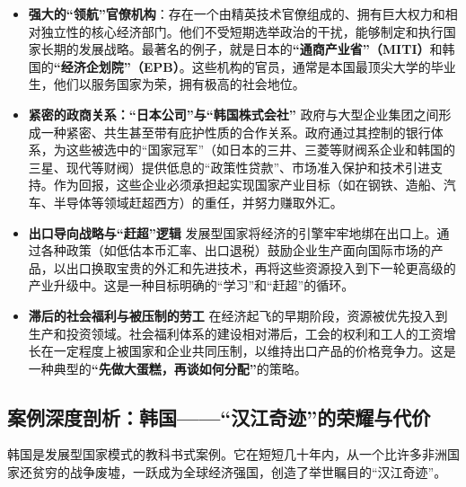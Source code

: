 \begin{itemize}
\item \textbf{强大的“领航”官僚机构}：存在一个由精英技术官僚组成的、拥有巨大权力和相对独立性的核心经济部门。他们不受短期选举政治的干扰，能够制定和执行国家长期的发展战略。最著名的例子，就是日本的\textbf{“通商产业省”（MITI）}和韩国的\textbf{“经济企划院”（EPB）}。这些机构的官员，通常是本国最顶尖大学的毕业生，他们以服务国家为荣，拥有极高的社会地位。
\item \textbf{紧密的政商关系：“日本公司”与“韩国株式会社”}
政府与大型企业集团之间形成一种紧密、共生甚至带有庇护性质的合作关系。政府通过其控制的银行体系，为这些被选中的“国家冠军”（如日本的三井、三菱等财阀系企业和韩国的三星、现代等财阀）提供低息的“政策性贷款”、市场准入保护和技术引进支持。作为回报，这些企业必须承担起实现国家产业目标（如在钢铁、造船、汽车、半导体等领域赶超西方）的重任，并努力赚取外汇。
\item \textbf{出口导向战略与“赶超”逻辑}
发展型国家将经济的引擎牢牢地绑在出口上。通过各种政策（如低估本币汇率、出口退税）鼓励企业生产面向国际市场的产品，以出口换取宝贵的外汇和先进技术，再将这些资源投入到下一轮更高级的产业升级中。这是一种目标明确的“学习”和“赶超”的循环。
\item \textbf{滞后的社会福利与被压制的劳工}
在经济起飞的早期阶段，资源被优先投入到生产和投资领域。社会福利体系的建设相对滞后，工会的权利和工人的工资增长在一定程度上被国家和企业共同压制，以维持出口产品的价格竞争力。这是一种典型的\textbf{“先做大蛋糕，再谈如何分配”}的策略。
\end{itemize}

\subsection{案例深度剖析：韩国——“汉江奇迹”的荣耀与代价}

韩国是发展型国家模式的教科书式案例。它在短短几十年内，从一个比许多非洲国家还贫穷的战争废墟，一跃成为全球经济强国，创造了举世瞩目的“汉江奇迹”。

